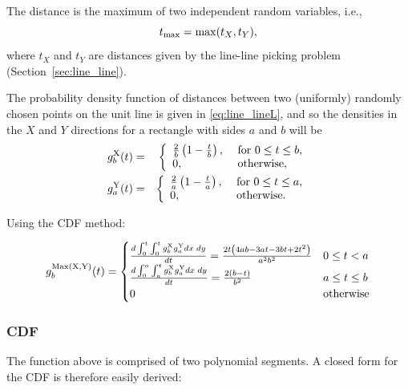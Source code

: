 The  distance is the maximum of two independent random variables, i.e.,
\[ t_{\rm max} = \max (t_X,  t_Y), \]
where $t_X$ and $t_Y$ are distances given by the line-line picking
problem (Section~\ref{sec:line_line}). 

The probability density function of distances between two (uniformly) 
randomly chosen points on the unit line is given in
\eqref{eq:line_lineL}, and so the densities in the $X$ and $Y$
directions for a rectangle with sides $a$ and $b$ will be 
\begin{eqnarray}
  \label{eq:rect_xy}
  g^{\rm X}_b(t) & = & \left\{ \begin{array}{ll}
                    \frac{2}{b} \left( 1-\frac{t}{b} \right), &
                         \mbox{ for } 0 \leq t \leq b, \\
                    0, & \mbox{ otherwise}, \\
                  \end{array} \right. \nonumber \\
  g^{\rm Y}_a(t) & = & \left\{ \begin{array}{ll}
                    \frac{2}{a} \left( 1-\frac{t}{a} \right), &
                         \mbox{ for } 0 \leq t \leq a, \\
                    0, & \mbox{ otherwise}. \\
                  \end{array} \right. \nonumber 
\end{eqnarray}

Using the CDF method: 

\begin{equation}
 g^{\rm Max( X, Y)}_b(t) =
 \begin{cases}
 \frac {d  \int_{0}^{t} \int_{0}^{t}  g^{\rm X}_b g^{\rm Y}_a  dx\; dy }{dt} = \frac{2 t \left(4 a b-3 a t-3 b t+2 t^2\right)}{a^2 b^2} & 0 \le t < a \\ 
 \frac {d  \int_{0}^{a} \int_{a}^{t}  g^{\rm X}_b g^{\rm Y}_a  dx\; dy }{dt} = \frac{2 (b-t)}{b^2}& a \le t  \le b \\ 
 0 & \mbox{otherwise}
 \end{cases}
\end{equation}




\subsubsection{CDF}

The function above is comprised of two polynomial segments. A
closed form for the CDF is therefore easily derived:

